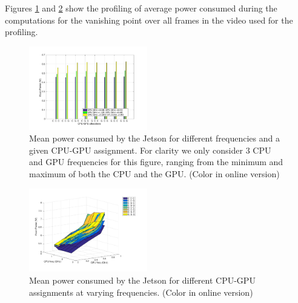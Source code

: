Figures \ref{fig:dfsa_pow} and \ref{fig:sfda_pow} show the profiling of average power consumed during the computations for the vanishing point over all frames in the video used for the profiling.


\begin{figure}[htbp]
\centering
\includegraphics[width=0.46\textwidth]{Data/figs/PowerHist.pdf}
\caption{Mean power consumed by the Jetson for different frequencies and a given CPU-GPU assignment.  For clarity we only consider 3 CPU and GPU frequencies for this figure, ranging from the minimum and maximum of both the CPU and the GPU. (Color in online version)}
\label{fig:dfsa_pow} %
\end{figure}

\begin{figure}[htbp]
	\centering
	\includegraphics[width=0.46\textwidth]{Data/figs/surf_Power.pdf}
	\caption{Mean power consumed by the Jetson for different CPU-GPU assignments at varying frequencies. (Color in online version)}
	\label{fig:sfda_pow}%
\end{figure}


